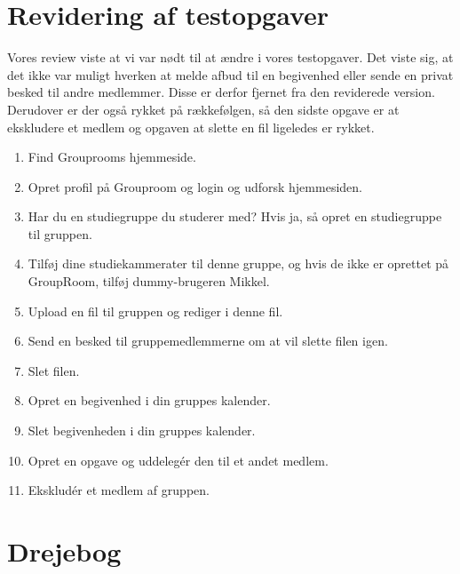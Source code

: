 \documentclass[12pt]{article}
\begin{document}
\section{Revidering af testopgaver}

Vores review viste at vi var nødt til at ændre i vores testopgaver. Det viste sig, at  det ikke var muligt hverken at melde afbud til en begivenhed eller sende en privat besked til andre medlemmer. Disse er derfor fjernet fra den reviderede version. Derudover er der også rykket på rækkefølgen, så den sidste opgave er at ekskludere et medlem og opgaven at slette en fil ligeledes er rykket.

\begin{enumerate}
\item Find Grouprooms hjemmeside.
\item Opret profil på Grouproom og login og udforsk hjemmesiden.
\item Har du en studiegruppe du studerer med? Hvis ja, så opret en studiegruppe til gruppen.
\item Tilføj dine studiekammerater til denne gruppe, og hvis de ikke er oprettet på GroupRoom, tilføj dummy-brugeren Mikkel.
\item Upload en fil til gruppen og rediger i denne fil.
\item Send en besked til gruppemedlemmerne om at vil slette filen igen.
\item Slet filen.
\item Opret en begivenhed i din gruppes kalender.
\item Slet begivenheden i din gruppes kalender.
\item Opret en opgave og uddelegér den til et andet medlem.
\item Ekskludér et medlem af gruppen.
\end{enumerate}

\section{Drejebog}
\end{document}
